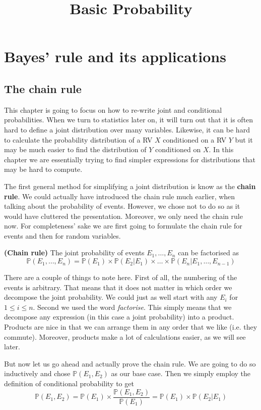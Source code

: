 \documentclass[a4paper,11pt,leqno]{report}
\title{Basic Probability}
\date{}
\begin{document}
\setcounter{chapter}{3}
\chapter{Bayes' rule and its applications}

\section{The chain rule}

This chapter is going to focus on how to re-write joint and conditional probabilities. When we turn to statistics later on, it will
turn out that it is often hard to define a joint distribution over many variables. Likewise, it can be hard to calculate 
the probability distribution of a RV $ X $ conditioned on a RV $ Y $ but it may be much easier to find the distribution of $ Y $
conditioned on $ X $. In this chapter we are essentially trying to find simpler expressions for distributions that may be hard to
compute.

The first general method for simplifying a joint distribution is know as the \textbf{chain rule}. We could actually have introduced
the chain rule much earlier, when talking about the probability of events. However, we chose not to do so as it would have 
cluttered the presentation. Moreover, we only need the chain rule now. For completeness' sake we are first going to formulate
the chain rule for events and then for random variables.

\begin{Theorem}{\textbf{(Chain rule)}}
The joint probability of events $ E_{1}, \ldots, E_{n} $ can be factorised as
$$ \mathbb{P}(E_{1}, \ldots, E_{n}) = \mathbb{P}(E_{1}) \times \mathbb{P}(E_{2}|E_{1}) \times \ldots \times \mathbb{P}(E_{n}|E_{1}, \ldots, E_{n-1}) $$
\end{Theorem} 

There are a couple of things to note here. First of all, the numbering of the events is arbitrary. That means that it does not matter in which
order we decompose the joint probability. We could just as well start with any $ E_{i} $ for $ 1 \leq i \leq n $. Second we used the 
word \textit{factorise}. This simply means that we decompose any expression (in this case a joint probability) into a product. Products are
nice in that we can arrange them in any order that we like (i.e. they commute). Moreover, products make a lot of calculations easier, as we will
see later.

But now let us go ahead and actually prove the chain rule. We are going to do so inductively and chose $ \mathbb{P}(E_{1}, E_{2}) $ as our
base case. Then we simply employ the definition of conditional probability to get
\begin{equation}
\mathbb{P}(E_{1}, E_{2}) = \mathbb{P}(E_{1}) \times \dfrac{\mathbb{P}(E_{1}, E_{2})}{\mathbb{P}(E_{1})} = \mathbb{P}(E_{1}) \times \mathbb{P}(E_{2}|E_{1})
\end{equation}
\end{document}
